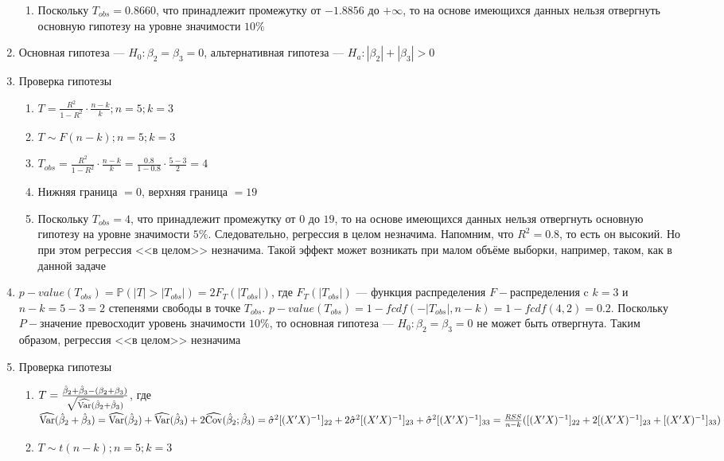 \documentclass[pdftex,11pt,openany]{book}\usepackage[]{graphicx}\usepackage[]{color}
\begin{document}
\begin{solution}
\begin{enumerate}
\begin{enumerate}
\item Поскольку $T_{obs} = 0.8660$, что принадлежит промежутку от $-1.8856$ до $+\infty$, то на основе имеющихся данных нельзя отвергнуть основную гипотезу на уровне значимости $10\%$
\end{enumerate}
\item Основная гипотеза --- $H_0: \beta_2 = \beta_3 = 0$, альтернативная гипотеза --- $H_a: |\beta_2| + |\beta_3| > 0$
\item Проверка гипотезы
\begin{enumerate}
\item $T = \frac{R^2}{1 - R^2} \cdot \frac{n-k}{k}; n = 5; k = 3$
\item $T \sim F(n-k); n = 5; k = 3$
\item $T_{obs} = \frac{R^2}{1 - R^2} \cdot \frac{n-k}{k} = \frac{0.8}{1 - 0.8} \cdot \frac{5-3}{2} = 4$
\item Нижняя граница $= 0$, верхняя граница $= 19$
\item Поскольку $T_{obs} = 4$, что принадлежит промежутку от $0$ до $19$, то на основе имеющихся данных нельзя отвергнуть основную гипотезу на уровне значимости $5\%$. Следовательно, регрессия в целом незначима. Напомним, что $R^2 = 0.8$, то есть он высокий. Но при этом регрессия <<в целом>> незначима. Такой эффект может возникать при малом объёме выборки, например, таком, как в данной задаче
\end{enumerate}
\item $p-value(T_{obs}) = \mathbb{P}(|T|>|T_{obs}|) = 2F_{T}(|T_{obs}|)$, где $F_{T}(|T_{obs}|)$ --- функция распределения $F-$распределения c $k = 3$ и $n - k = 5 - 3 = 2$ степенями свободы в точке $T_{obs}$. $p-value(T_{obs}) = 1 - fcdf(-|T_{obs}|, n - k) = 1 - fcdf(4,2) = 0.2$. Поскольку $P-$значение превосходит уровень значимости $10\%$, то основная гипотеза --- $H_0: \beta_2 = \beta_3 = 0$ не может быть отвергнута. Таким образом, регрессия <<в целом>> незначима
\item Проверка гипотезы
\begin{enumerate}
\item $T = \frac{\hat{\beta}_2 + \hat{\beta}_3 - (\beta_2 + \beta_3)}{\sqrt{\widehat{\operatorname{Var}}(\hat{\beta}_2 + \hat{\beta}_3)}}$, где $\widehat{\operatorname{Var}}(\hat{\beta}_2 + \hat{\beta}_3) = \widehat{\operatorname{Var}}(\hat{\beta}_2) + \widehat{\operatorname{Var}}(\hat{\beta}_3) + 2\widehat{\operatorname{Cov}}(\hat{\beta}_2;\hat{\beta}_3) = \hat{\sigma}^2 [(X'X)^{-1}]_{22} + 2\hat{\sigma}^2 [(X'X)^{-1}]_{23} + \hat{\sigma}^2 [(X'X)^{-1}]_{33}= \frac{RSS}{n - k}([(X'X)^{-1}]_{22} + 2[(X'X)^{-1}]_{23} + [(X'X)^{-1}]_{33})$
\item $T \sim t(n-k); n = 5; k = 3$

\end{enumerate}
\end{enumerate}
\end{solution}
\end{document}
